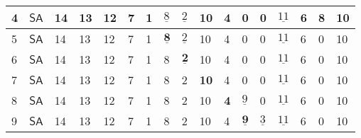 \begin{table}
{\begin{tabular}{l|l|lllllllllllllll}
			4       & $\mathsf{SA}$ & 14          & 13                                  & 12                                  & 7          & \textbf{1} & $\underline{8}$           & $\underline{2}$           & 10          & 4          & 0                                       & 0                                       & $\underline{11}$                         & \cellcolor[HTML]{32CB00}6 & 8                         & 10                        \\ \hline
			5       & $\mathsf{SA}$ & 14          & 13                                  & 12                                  & 7          & 1          & $\underline{\textbf{8}}$  & $\underline{2}$           & 10          & 4          & 0                                       & 0                                       & $\underline{11}$                         & 6                         & \cellcolor[HTML]{32CB00}0 & 10                        \\ \hline
			6       & $\mathsf{SA}$ & 14          & 13                                  & 12                                  & 7          & 1          & \cellcolor[HTML]{34CDF9}8 & $\underline{\textbf{2}}$  & 10          & 4          & 0                                       & 0                                       & $\underline{11}$                         & 6                         & 0                         & 10                        \\ \hline
			7       & $\mathsf{SA}$ & 14          & 13                                  & 12                                  & 7          & 1          & 8                         & \cellcolor[HTML]{34CDF9}2 & \textbf{10} & 4          & 0                                       & 0                                       & $\underline{11}$                         & 6                         & 0                         & 10                        \\ \hline
			8       & $\mathsf{SA}$ & 14          & 13                                  & 12                                  & 7          & 1          & 8                         & 2                         & 10          & \textbf{4} & \cellcolor[HTML]{32CB00}$\underline{9}$ & 0                                       & $\underline{11}$                         & 6                         & 0                         & 10                        \\ \hline
			9       & $\mathsf{SA}$ & 14          & 13                                  & 12                                  & 7          & 1          & 8                         & 2                         & 10          & 4          & $\underline{\textbf{9}}$                & \cellcolor[HTML]{32CB00}$\underline{3}$ & $\underline{11}$                         & 6                         & 0                         & 10                        \\ \hline

\end{tabular}}
\end{table}

